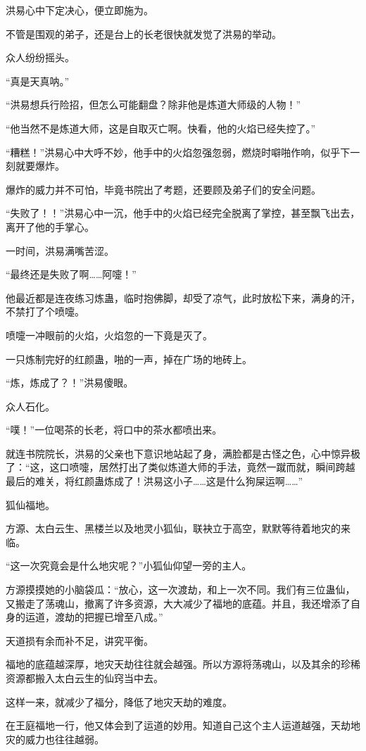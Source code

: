 \begin{this_body}
洪易心中下定决心，便立即施为。

不管是围观的弟子，还是台上的长老很快就发觉了洪易的举动。

众人纷纷摇头。

“真是天真呐。”

“洪易想兵行险招，但怎么可能翻盘？除非他是炼道大师级的人物！”

“他当然不是炼道大师，这是自取灭亡啊。快看，他的火焰已经失控了。”

“糟糕！”洪易心中大呼不妙，他手中的火焰忽强忽弱，燃烧时噼啪作响，似乎下一刻就要爆炸。

爆炸的威力并不可怕，毕竟书院出了考题，还要顾及弟子们的安全问题。

“失败了！！”洪易心中一沉，他手中的火焰已经完全脱离了掌控，甚至飘飞出去，离开了他的手掌心。

一时间，洪易满嘴苦涩。

“最终还是失败了啊……阿嚏！”

他最近都是连夜练习炼蛊，临时抱佛脚，却受了凉气，此时放松下来，满身的汗，不禁打了个喷嚏。

喷嚏一冲眼前的火焰，火焰忽的一下竟是灭了。

一只炼制完好的红颜蛊，啪的一声，掉在广场的地砖上。

“炼，炼成了？！”洪易傻眼。

众人石化。

“噗！”一位喝茶的长老，将口中的茶水都喷出来。

就连书院院长，洪易的父亲也下意识地站起了身，满脸都是古怪之色，心中惊异极了：“这，这口喷嚏，居然打出了类似炼道大师的手法，竟然一蹴而就，瞬间跨越最后的难关，将红颜蛊炼成了！洪易这小子……这是什么狗屎运啊……”

狐仙福地。

方源、太白云生、黑楼兰以及地灵小狐仙，联袂立于高空，默默等待着地灾的来临。

“这一次究竟会是什么地灾呢？”小狐仙仰望一旁的主人。

方源摸摸她的小脑袋瓜：“放心，这一次渡劫，和上一次不同。我们有三位蛊仙，又搬走了荡魂山，撤离了许多资源，大大减少了福地的底蕴。并且，我还增添了自身的运道，渡劫的把握已增至八成。”

天道损有余而补不足，讲究平衡。

福地的底蕴越深厚，地灾天劫往往就会越强。所以方源将荡魂山，以及其余的珍稀资源都搬入太白云生的仙窍当中去。

这样一来，就减少了福分，降低了地灾天劫的难度。

在王庭福地一行，他又体会到了运道的妙用。知道自己这个主人运道越强，天劫地灾的威力也往往越弱。


\end{this_body}
